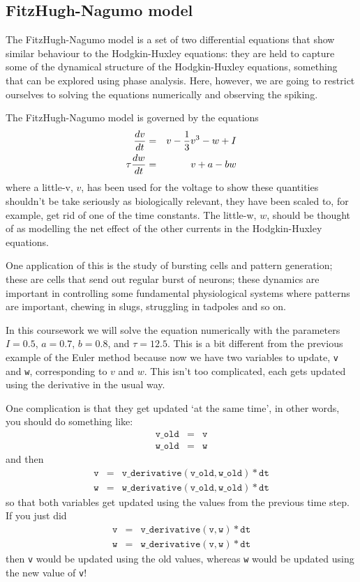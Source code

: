 \documentclass[12pt]{article}
\begin{document}
\subsection*{FitzHugh-Nagumo model}

The FitzHugh-Nagumo model \cite{FitzHugh1955,Nagumo1962} is a set of
two differential equations that show similar behaviour to the
Hodgkin-Huxley equations: they are held to capture some of the
dynamical structure of the Hodgkin-Huxley equations, something that
can be explored using phase analysis. Here, however, we are going to
restrict ourselves to solving the equations numerically and observing
the spiking.

The FitzHugh-Nagumo model is governed by the equations
\begin{eqnarray}
\frac{dv}{dt}&=&v-\frac{1}{3}v^3-w+I\cr
\tau\frac{dw}{dt}&=&v+a-bw
\end{eqnarray}
where a little-v, $v$, has been used for the voltage to show these
quantities shouldn't be take seriously as biologically relevant, they
have been scaled to, for example, get rid of one of the time
constants. The little-w, $w$, should be thought of as modelling the
net effect of the other currents in the Hodgkin-Huxley equations.

One application of this is the study of bursting cells and pattern
generation; these are cells that send out regular burst of neurons;
these dynamics are important in controlling some fundamental
physiological systems where patterns are important, chewing in slugs,
struggling in tadpoles and so on.

In this coursework we will solve the equation numerically with the
parameters $I=0.5$, $a=0.7$, $b=0.8$, and $\tau=12.5$. This is a bit
different from the previous example of the Euler method because now we
have two variables to update, \texttt{v} and \texttt{w}, corresponding
to $v$ and $w$. This isn't too complicated, each gets updated using
the derivative in the usual way.

One complication is that they get
updated `at the same time', in other words, you should do something like:
\begin{eqnarray*}
  \mathtt{v\_old}&=&\mathtt{v}\\
  \mathtt{w\_old}&=&\mathtt{w}
\end{eqnarray*}
and then
\begin{eqnarray*}
  \mathtt{v}&=&\mathtt{v\_derivative(v\_old,w\_old)*dt}\\
  \mathtt{w}&=&\mathtt{w\_derivative(v\_old,w\_old)*dt}
\end{eqnarray*}
so that both variables get updated using the values from the previous time step. If you just did
\begin{eqnarray*}
  \mathtt{v}&=&\mathtt{v\_derivative(v,w)*dt}\\
  \mathtt{w}&=&\mathtt{w\_derivative(v,w)*dt}
\end{eqnarray*}
then \texttt{v} would be updated using the old values, whereas \texttt{w} would be updated using the new value of \texttt{v}!
\end{document}
